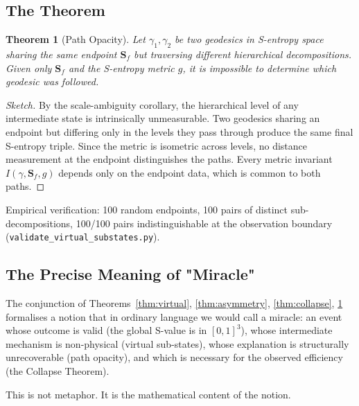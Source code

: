 \documentclass[twocolumn,11pt,a4paper]{article}
\newtheorem{theorem}{Theorem}[section]
\begin{document}
\subsection{The Theorem}

\begin{theorem}[Path Opacity]
\label{thm:opacity}
Let $\gamma_1, \gamma_2$ be two geodesics in S-entropy space sharing the same endpoint $\mathbf{S}_f$ but traversing different hierarchical decompositions. Given only $\mathbf{S}_f$ and the S-entropy metric $g$, it is impossible to determine which geodesic was followed.
\end{theorem}

\begin{proof}[Sketch]
By the scale-ambiguity corollary, the hierarchical level of any intermediate state is intrinsically unmeasurable. Two geodesics sharing an endpoint but differing only in the levels they pass through produce the same final S-entropy triple. Since the metric is isometric across levels, no distance measurement at the endpoint distinguishes the paths. Every metric invariant $I(\gamma, \mathbf{S}_f, g)$ depends only on the endpoint data, which is common to both paths.
\end{proof}

Empirical verification: 100 random endpoints, 100 pairs of distinct sub-decompositions, 100/100 pairs indistinguishable at the observation boundary (\texttt{validate\_virtual\_substates.py}).

\subsection{The Precise Meaning of "Miracle"}

The conjunction of Theorems~\ref{thm:virtual}, \ref{thm:asymmetry}, \ref{thm:collapse}, \ref{thm:opacity} formalises a notion that in ordinary language we would call a miracle: an event whose outcome is valid (the global S-value is in $[0,1]^3$), whose intermediate mechanism is non-physical (virtual sub-states), whose explanation is structurally unrecoverable (path opacity), and which is necessary for the observed efficiency (the Collapse Theorem).

This is not metaphor. It is the mathematical content of the notion.
\end{document}
